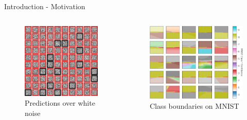 \documentclass{beamer}
\begin{document}
\begin{frame}{Introduction - Motivation}
    \begin{columns}
    \begin{column}{.34\textwidth}
    \begin{figure}
        \includegraphics[width=.8\textwidth]{images/Motivation/pred_noise.png}
        \caption*{Predictions over white noise}
    \end{figure}
    \end{column}
    \begin{column}{.34\textwidth}
    \begin{figure}
        \includegraphics[width=1.\textwidth]{images/Motivation/boundaries.png}
        \caption*{Class boundaries on MNIST}
    \end{figure}
    \end{column}
    \end{columns}
    
\end{frame}
\end{document}
